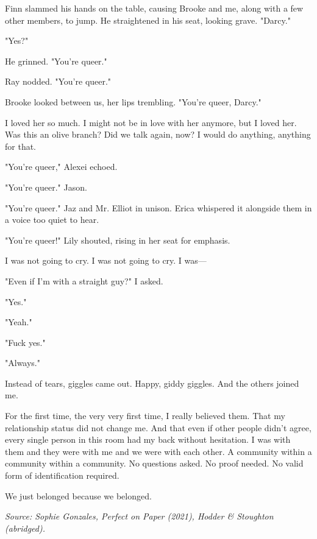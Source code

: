 \documentclass[10pt,a4paper]{article}
\begin{document}
Finn slammed his hands on the table, causing Brooke and me, along with a few other members, to jump. He straightened in his seat, looking grave. "Darcy."

"Yes?"

He grinned. "You're queer."

Ray nodded. "You're queer."

Brooke looked between us, her lips trembling. "You're queer, Darcy."

I loved her so much. I might not be in love with her anymore, but I loved her. Was this an olive branch? Did we talk again, now? I would do anything, anything for that.

"You're queer," Alexei echoed.

"You're queer." Jason.

"You're queer." Jaz and Mr. Elliot in unison. Erica whispered it alongside them in a voice too quiet to hear.

"You're queer!" Lily shouted, rising in her seat for emphasis.

I was not going to cry. I was not going to cry. I was---

"Even if I'm with a straight guy?" I asked.

"Yes."

"Yeah."

"Fuck yes."

"Always."

Instead of tears, giggles came out. Happy, giddy giggles. And the others joined me.

For the first time, the very very first time, I really believed them. That my relationship status did not change me. And that even if other people didn't agree, every single person in this room had my back without hesitation. I was with them and they were with me and we were with each other. A community within a community within a community. No questions asked. No proof needed. No valid form of identification required.

We just belonged because we belonged.

\bigskip
\noindent\textit{Source: Sophie Gonzales, \textit{Perfect on Paper} (2021), Hodder \& Stoughton (abridged).}
\end{document}
